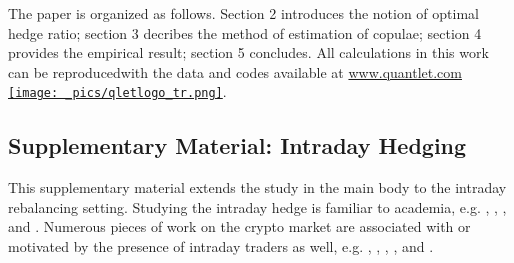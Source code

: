 \documentclass[11pt,a4paper,english]{article}
\begin{document}


The paper is organized as follows. Section 2 introduces the notion of
optimal hedge ratio; section 3 decribes the method of estimation of
copulae; section 4 provides the empirical result; section 5
concludes. 
All calculations in this work can be reproducedwith the data and codes
available at \href{http://www.quantlet.com/}{www.quantlet.com
  {\texttt{[image: \_pics/qletlogo\_tr.png]}}}. 



%




\newpage
%


\subsection{Supplementary Material: Intraday Hedging}
This supplementary material extends the study in the main body to the intraday rebalancing setting. Studying the intraday hedge is familiar to academia,
e.g. \citet{harris2010limits}, \citet{dungey2013impact}, \citet{tse2013does}, and \citet{sheu2014incremental}.
Numerous pieces of work on the crypto market are associated with or motivated by the presence of intraday traders as well,
e.g. \citet{petukhina2021rise}, \citet{meshcheryakov2020ethereum}, \citet{alexander2022role}, \citet{zhang2022data}, and \citet{katsiampa2022high}.
\end{document}
